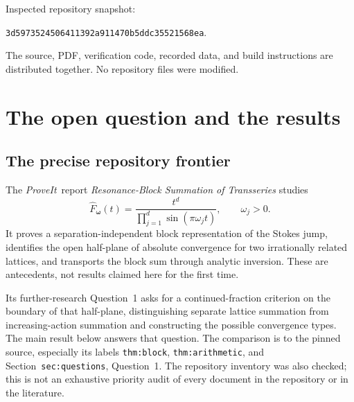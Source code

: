 \documentclass[11pt,a4paper]{article}
\numberwithin{equation}{section}
\theoremstyle{definition}
\theoremstyle{remark}
\newcommand{\re}{\operatorname{Re}}
\newcommand{\repo}{\textit{ProveIt}}
\begin{document}
\begin{titlepage}
\begin{abstract}
For $d$ sine lattices we also prove that Riesz weighting of integer order
$m\ge d-1$ recovers the block sum throughout $\re z>0$, without any
Diophantine hypothesis. It has an exact finite derivative bias and an
exponentially small remainder, uniform across arbitrarily close poles.
The threshold $d-1$ is sharp for gap-independent uniform control, while
continuity at a collision exactly on the cutoff requires one additional
order. Richardson extrapolation removes the bias, and a local inverse
stability theorem transports the exponential accuracy through nonlinear
inversion. All new assertions are proved conventionally; 192 exact
finite checks and 49 high-precision diagnostics accompany the article.
No Lean verification or independently established publication priority
is claimed.
\end{abstract}
\vfill
\noindent\small Inspected repository snapshot:\par
\noindent\small\texttt{3d5973524506411392a911470b5ddc35521568ea}.\par
\noindent\small The source, PDF, verification code, recorded data, and build instructions
are distributed together. No repository files were modified.
\end{titlepage}
\hypersetup{pageanchor=true}
\tableofcontents
\newpage

\section{The open question and the results}
\label{sec:introduction}

\subsection{The precise repository frontier}
The \repo\ report \emph{Resonance-Block Summation of Transseries}
\cite{repo-block} studies
\begin{equation}
 \widehat F_{\boldsymbol\omega}(t)
 =\frac{t^d}{\prod_{j=1}^{d}\sin(\pi\omega_jt)},\qquad \omega_j>0.
 \label{eq:original-kernel}
\end{equation}
It proves a separation-independent block representation of the Stokes
jump, identifies the open half-plane of absolute convergence for two
irrationally related lattices, and transports the block sum through
analytic inversion. These are antecedents, not results claimed here for
the first time.

Its further-research Question~1 asks for a continued-fraction criterion
on the boundary of that half-plane, distinguishing separate lattice
summation from increasing-action summation and constructing the possible
convergence types. The main result below answers that question. The
comparison is to the pinned source, especially its labels
\texttt{thm:block}, \texttt{thm:arithmetic}, and Section~\texttt{sec:questions},
Question~1. The repository inventory \cite{repo-index} was also checked;
this is not an exhaustive priority audit of every document in the
repository or in the literature.
\end{document}

